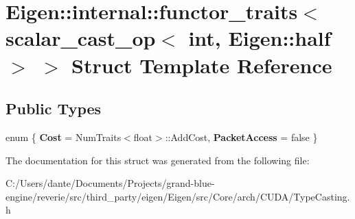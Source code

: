 \hypertarget{struct_eigen_1_1internal_1_1functor__traits_3_01scalar__cast__op_3_01int_00_01_eigen_1_1half_01_4_01_4}{}\section{Eigen\+::internal\+::functor\+\_\+traits$<$ scalar\+\_\+cast\+\_\+op$<$ int, Eigen\+::half $>$ $>$ Struct Template Reference}
\label{struct_eigen_1_1internal_1_1functor__traits_3_01scalar__cast__op_3_01int_00_01_eigen_1_1half_01_4_01_4}
\subsection*{Public Types}
\begin{DoxyCompactItemize}
\item 
\mbox{\label{struct_eigen_1_1internal_1_1functor__traits_3_01scalar__cast__op_3_01int_00_01_eigen_1_1half_01_4_01_4_a16d8546b02c4acd32b8cfbdfb3611174}} 
enum \{ {\bfseries Cost} = Num\+Traits$<$float$>$\+::Add\+Cost, 
{\bfseries Packet\+Access} = false
 \}
\end{DoxyCompactItemize}


The documentation for this struct was generated from the following file\+:\begin{DoxyCompactItemize}
\item 
C\+:/\+Users/dante/\+Documents/\+Projects/grand-\/blue-\/engine/reverie/src/third\+\_\+party/eigen/\+Eigen/src/\+Core/arch/\+C\+U\+D\+A/Type\+Casting.\+h\end{DoxyCompactItemize}
